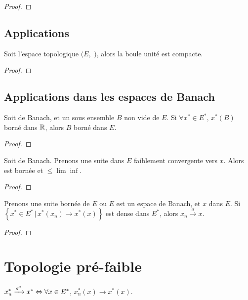 \begin{proof}
	
\end{proof}

\subsection{Applications}

\begin{theorem}
	Soit l'espace topologique $(E,$ $)$, alors la boule unité
	est compacte.
\end{theorem}

\begin{proof}
	
\end{proof}

\subsection{Applications dans les espaces de Banach}

\begin{proposition}
	Soit  de Banach, et un sous ensemble $B$ non
	vide de $E$.
	Si $\forall x^{*} \in E^{*}$, $x^{*}(B)$ borné dans $\mathbb{R}$, alors $B$ borné
	dans $E$.
\end{proposition}

\begin{proof}
	
\end{proof}

\begin{corollary}
	Soit  de Banach.
	Prenons une suite  dans $E$ faiblement
	convergente vers $x$.
	Alors  est bornée et  $\leq
	\lim\inf$.
\end{corollary}

\begin{proof}
	
\end{proof}

\begin{proposition}
	Prenons une suite bornée de $E$ ou $E$ est un espace de Banach, et $x$ dans
	$E$.
	Si $\left\{ x^{*} \in E^{*} \, | \, x^{*}(x_{n}) \rightarrow x^{*}(x)
\right\}$ est dense dans $E^{*}$, alors $x_{n} \xrightarrow{\sigma} x$.
\end{proposition}

\begin{proof}
	
\end{proof}

\section{Topologie pré-faible}


\begin{proposition}
	$x^{*}_{n} \xrightarrow{\sigma^{*}} x^{*} \Leftrightarrow \forall x \in E^{*}$,
	$x^{*}_{n}(x) \rightarrow x^{*}(x)$.
\end{proposition}
